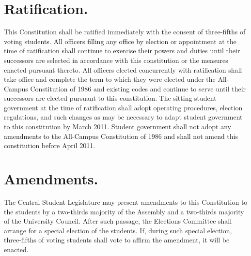 \section{Ratification.}
    This Constitution shall be ratified immediately with the consent of three-fifths of voting students. All officers filling any office by election or appointment at the time of ratification shall continue to exercise their powers and duties until their successors are selected in accordance with this constitution or the measures enacted pursuant thereto. All officers elected concurrently with ratification shall take office and complete the term to which they were elected under the All-Campus Constitution of 1986 and existing codes and continue to serve until their successors are elected pursuant to this constitution. The sitting student government at the time of ratification shall adopt operating procedures, election regulations, and such changes as may be necessary to adapt student government to this constitution by March 2011. Student government shall not adopt any amendments to the All-Campus Constitution of 1986 and shall not amend this constitution before April 2011.

\section{Amendments.}
    The Central Student Legislature may present amendments to this Constitution to the students by a two-thirds majority of the Assembly and a two-thirds majority of the University Council. After such passage, the Elections Committee shall arrange for a special election of the students. If, during such special election, three-fifths of voting students shall vote to affirm the amendment, it will be enacted.